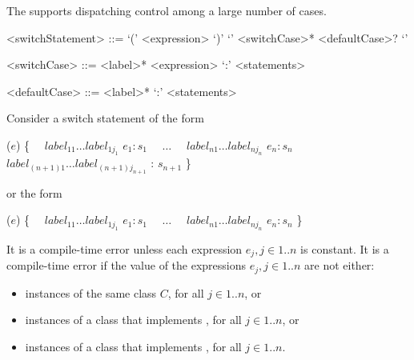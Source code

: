 \documentclass[makeidx]{article}
\begin{document}
\LMHash{}%
The  supports dispatching control among
a large number of cases.

\begin{grammar}
<switchStatement> ::= \gnewline{}
  \SWITCH{} `(' <expression> `)' `{' <switchCase>* <defaultCase>? `}'

<switchCase> ::= <label>* \CASE{} <expression> `:' <statements>

<defaultCase> ::= <label>* \DEFAULT{} `:' <statements>
\end{grammar}

\LMHash{}%
Consider a switch statement of the form

\begin{normativeDartCode}
\SWITCH{} ($e$) \{
\ \ $label_{11} \ldots label_{1j_1}$ \CASE{} $e_1: s_1$
\ \ $\ldots$
\ \ $label_{n1} \ldots label_{nj_n}$ \CASE{} $e_n: s_n$
\ \ $label_{(n+1)1} \ldots label_{(n+1)j_{n+1}}$ \DEFAULT{}: $s_{n+1}$
\}
\end{normativeDartCode}

\noindent
or the form

\begin{normativeDartCode}
\SWITCH{} ($e$) \{
\ \ $label_{11} \ldots label_{1j_1}$ \CASE{} $e_1: s_1$
\ \ $\ldots$
\ \ $label_{n1} \ldots label_{nj_n}$ \CASE{} $e_n: s_n$
\}
\end{normativeDartCode}


\LMHash{}%
It is a compile-time error unless each expression
$e_j, j \in 1 .. n$ is constant.
It is a compile-time error if the value of the expressions
$e_j, j \in 1 .. n$ are not either:
\begin{itemize}
\item instances of the same class $C$, for all $j \in 1 .. n$, or
\item instances of a class that implements ,
  for all $j \in 1 .. n$, or
\item instances of a class that implements ,
  for all $j \in 1 .. n$.
\end{itemize}

\end{document}
